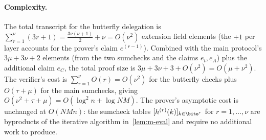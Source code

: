 \paragraph{Complexity.} The total transcript for the butterfly delegation is $\sum_{r=1}^{\nu} (3r + 1) = \frac{3\nu(\nu+1)}{2} + \nu = O(\nu^2)$ extension field elements (the $+1$ per layer accounts for the prover's claim $e^{(r-1)}$).
Combined with the main protocol's $3\mu + 3\nu + 2$ elements (from the two sumchecks and the claims $e_t, e_A$) plus the additional claim $e_C$, the total proof size is $3\mu + 3\nu + 3 + O(\nu^2) = O(\mu + \nu^2)$.
The verifier's cost is $\sum_{r=1}^{\nu} O(r) = O(\nu^2)$ for the butterfly checks plus $O(\tau + \mu)$ for the main sumchecks, giving $O(\nu^2 + \tau + \mu) = O(\log^2 n + \log NM)$.
The prover's asymptotic cost is unchanged at $O(NMn)$: the sumcheck tables $[h^{(r)}(k)]_{k \in \bits^r}$ for $r = 1, \ldots, \nu$ are byproducts of the iterative algorithm in~\cref{lem:m-eval} and require no additional work to produce.
